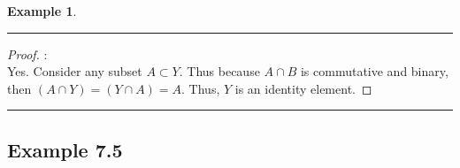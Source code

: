 \documentclass[openany, amssymb, psamsfonts]{amsart}
\theoremstyle{definition}
\newtheorem{exmp}{Example}[section]
\numberwithin{equation}{section}
\begin{document}
\begin{exmp}
\begin{enumerate}
	\end{enumerate}
 \vspace{4pt}     \hrule   \vspace{4pt} \begin{proof}:\\
Yes. Consider any subset $A \subset Y$. Thus because $A\cap B$ is commutative and binary, then $(A \cap Y) = (Y \cap A) = A$. Thus, $Y$ is an identity element. 
\end{proof}		
\vspace{4pt}     \hrule   \vspace{4pt}
\end{exmp}

\subsection*{Example 7.5}
\end{document}
